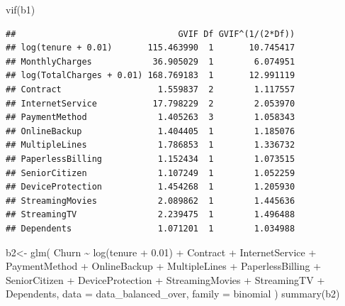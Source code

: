 \documentclass[
  twoside]{article}
\newenvironment{Shaded}{\begin{snugshade}}{\end{snugshade}}
\newcommand{\AttributeTok}[1]{\textcolor[rgb]{0.77,0.63,0.00}{#1}}
\newcommand{\FloatTok}[1]{\textcolor[rgb]{0.00,0.00,0.81}{#1}}
\newcommand{\FunctionTok}[1]{\textcolor[rgb]{0.00,0.00,0.00}{#1}}
\newcommand{\NormalTok}[1]{#1}
\newcommand{\OtherTok}[1]{\textcolor[rgb]{0.56,0.35,0.01}{#1}}
\newcommand{\SpecialCharTok}[1]{\textcolor[rgb]{0.00,0.00,0.00}{#1}}
\begin{document}
\begin{Shaded}
\begin{Highlighting}[]
\FunctionTok{vif}\NormalTok{(b1)}
\end{Highlighting}
\end{Shaded}

\begin{verbatim}
##                                GVIF Df GVIF^(1/(2*Df))
## log(tenure + 0.01)       115.463990  1       10.745417
## MonthlyCharges            36.905029  1        6.074951
## log(TotalCharges + 0.01) 168.769183  1       12.991119
## Contract                   1.559837  2        1.117557
## InternetService           17.798229  2        2.053970
## PaymentMethod              1.405263  3        1.058343
## OnlineBackup               1.404405  1        1.185076
## MultipleLines              1.786853  1        1.336732
## PaperlessBilling           1.152434  1        1.073515
## SeniorCitizen              1.107249  1        1.052259
## DeviceProtection           1.454268  1        1.205930
## StreamingMovies            2.089862  1        1.445636
## StreamingTV                2.239475  1        1.496488
## Dependents                 1.071201  1        1.034988
\end{verbatim}

\begin{Shaded}
\begin{Highlighting}[]
\NormalTok{b2}\OtherTok{\textless{}{-}} \FunctionTok{glm}\NormalTok{(}
\NormalTok{  Churn }\SpecialCharTok{\textasciitilde{}} \FunctionTok{log}\NormalTok{(tenure }\SpecialCharTok{+} \FloatTok{0.01}\NormalTok{)}
  \SpecialCharTok{+}\NormalTok{ Contract  }\SpecialCharTok{+}\NormalTok{ InternetService }\SpecialCharTok{+}\NormalTok{ PaymentMethod }
  \SpecialCharTok{+}\NormalTok{ OnlineBackup }\SpecialCharTok{+}\NormalTok{ MultipleLines }\SpecialCharTok{+}\NormalTok{ PaperlessBilling }\SpecialCharTok{+}\NormalTok{ SeniorCitizen }
   \SpecialCharTok{+}\NormalTok{ DeviceProtection }\SpecialCharTok{+}\NormalTok{ StreamingMovies }\SpecialCharTok{+}\NormalTok{ StreamingTV }
  \SpecialCharTok{+}\NormalTok{ Dependents,}
  \AttributeTok{data =}\NormalTok{ data\_balanced\_over,}
  \AttributeTok{family =}\NormalTok{ binomial}
\NormalTok{)}
\FunctionTok{summary}\NormalTok{(b2)}
\end{Highlighting}
\end{Shaded}
\end{document}
